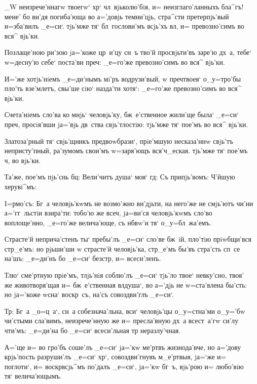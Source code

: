 _W неизрече'ннагw твоегw` хр` чл~вjьколю'бiя, и= 
неизглаго'ланныхъ бла^гъ! мене' бо ви'дя погиба'юща во 
а='довjь темни'цjь, стра^сти претерпjь'вый и=зба'вилъ 
_е=си`. тjь'мже тя` бл~гослови'мъ всjь'хъ вл, и= 
превозно'симъ во вся^ вjь'ки. 


Позлаще'ною ри'зою jа='коже цр~и'цу сн~ъ тво'й 
просвjьти'въ заре'ю дх~а, тебе` w=десну'ю себе` поста'ви 
преч: _е=го'же превозно'симъ во вся^ вjь'ки.

И='же хотjь'нiемъ _е=ди'нымъ мi'ръ водрузи'вый, w\т 
преч твоея` о_у=тро'бы пло'ть взе'млетъ, свы'ше сiю` 
назда'ти хотя`: _е=го'же превозно'симъ во вся^ вjь'ки.

Счета'нiемъ сло'ва ко мнjь` человjь'ку, бж~е'ственное 
жили'ще была` _е=си` преч, просiя'вши jа='вjь 
дв~ства свjь'тлостiю: тjь'мже тя` пое'мъ во вся^ вjь'ки.

Златоза'рный тя` свjь'щникъ предвоwбрази`, прiе'мшую 
несказа'ннw свjь'тъ непристу'пный, ра'зумомъ свои'мъ 
w=заря'ющъ вся'ч_еская. тjь'мже тя` пое'мъ ч, во 
вjь'ки.

Та'же, пое'мъ пjь'снь бц: Вели'читъ душа` моя` 
гд: Съ припjь'вомъ: Ч'йшую херувi^мъ:


I=рмо'съ: Бг~а человjь'кwмъ не возмо'жно ви'дjьти, на 
него'же не смjь'ютъ чи'ни а='гг~льстiи взира'ти: тобо'ю 
же всеч, jа=ви'ся человjь'кwмъ сло'во воплоще'нно, 
_е=го'же велича'юще, съ нб вw'и тя` о_у=бл~жа'емъ. 

Страсте'й неприча'стенъ ты` пребы'лъ _е=си` сло'ве 
бж~iй, пло'тiю прiwбщи'вся стр_е'мъ: но рjьши'ши w\т 
страсте'й человjь'ка, стр_е'мъ бы'въ стра'сть сп~се 
на'шъ: _е=ди'нъ бо _е=си` безстр, и= всеси'ленъ.

Тлю` сме'ртную прiе'мъ, тлjь'нiя соблю'лъ _е=си` 
тjь'ло твое` невку'сно, твоя' же животворя'щая и= 
бж~е'ственная вл душа`, во а='дjь не w=ста'влена 
бы'сть: но jа='коже w\т сна` воскр~съ, на'съ совоздви'глъ 
_е=си`.

Тр: Бг~а _о=ц~а`, сн~а собезнача'льна, вси` 
человjь'цы о_у=стна'ми о_у='бw чи'стыми сла'вимъ, 
неизрече'нную же и= пресла'вную дх~а всест~а'гw си'лу 
чти'мъ: _е=ди'на бо _е=си` всеси'льная тр 
неразлу'чная. 


А='ще и= во гро'бъ соше'лъ _е=си` jа='кw ме'ртвъ 
жизнода'вче, но а='дову крjь'пость разруши'лъ _е=си` 
хр`, совоздви'гнувъ м_е'ртвыя, jа=`же и= поглоти`, и= 
воскр всjь^мъ по'далъ _е=си`, jа='кw бг~ъ, вjь'рою 
и= любо'вiю тя` велича'ющымъ.

